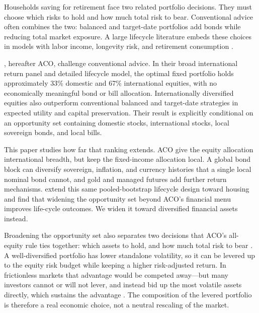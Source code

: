 \documentclass[11pt]{article}
\begin{document}
Households saving for retirement face two related portfolio decisions. They
must choose which risks to hold and how much total risk to bear. Conventional
advice often combines the two: balanced and target-date portfolios add bonds
while reducing total market exposure. A large lifecycle literature embeds
these choices in models with labor income, longevity risk, and retirement
consumption \citep[e.g.,][]{CampbellViceira2002,CoccoGomesMaenhout2005}.

\citet{AnarkulovaCederburgODoherty2025}, hereafter ACO, challenge conventional
advice. In their broad international return panel and detailed lifecycle
model, the optimal fixed portfolio holds approximately 33\% domestic and 67\%
international equities, with no economically meaningful bond or bill
allocation. Internationally diversified equities also outperform conventional
balanced and target-date strategies in expected utility and capital
preservation. Their result is explicitly conditional on an opportunity set
containing domestic stocks, international stocks, local sovereign bonds, and
local bills.

This paper studies how far that ranking extends. ACO give the equity allocation
international breadth, but keep the \mbox{fixed-income} allocation local. A global
bond block can diversify sovereign, inflation, and currency histories that a
single local nominal bond cannot, and gold and managed futures add further
return mechanisms. \citet{BaiLiShen2024} extend this same pooled-bootstrap
lifecycle design toward housing and find that widening the opportunity set
beyond ACO's financial menu improves life-cycle outcomes. We widen it toward
diversified financial assets instead.

Broadening the opportunity set also separates two decisions that ACO's
all-equity rule ties together: which assets to hold, and how much total risk to
bear \citep{Markowitz1952,Asness1996}. A well-diversified portfolio has lower
standalone volatility, so it can be levered up to the equity risk budget while
keeping a higher risk-adjusted return. In frictionless markets that advantage
would be competed away---but many investors cannot or will not lever, and
instead bid up the most volatile assets directly, which sustains the advantage
\citep{FrazziniPedersen2014}. The composition of the levered portfolio is
therefore a real economic choice, not a neutral rescaling of the market.
\end{document}
